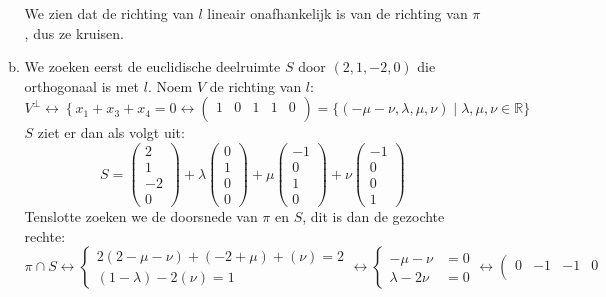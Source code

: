 \documentclass[main.tex]{subfiles}
\begin{document}
\begin{enumerate}
\begin{enumerate}[(a)]
\[    \]
    We zien dat de richting van $l$ lineair onafhankelijk is van de richting van $\pi$, dus ze kruisen.
  \item 
    We zoeken eerst de euclidische deelruimte $S$ door $(2,1,-2,0)$ die orthogonaal is met $l$.
    Noem $V$ de richting van $l$:
    \[
    V^{\bot} \leftrightarrow
    \left\{
    x_{1} + x_{3} + x_{4} = 0
    \right.
    \leftrightarrow
    \left(
      \begin{array}{cccc|c}
        1 & 0 & 1 & 1 & 0\\
      \end{array}
    \right)
    =
    \{ (-\mu -\nu, \lambda,\mu,\nu) \mid \lambda,\mu,\nu \in \mathbb{R} \}
    \]
    $S$ ziet er dan als volgt uit:
    \[ S  = 
    \begin{pmatrix}
      2\\1\\-2\\0
    \end{pmatrix}
    +
    \lambda
    \begin{pmatrix}
      0\\1\\0\\0
    \end{pmatrix}
    + \mu
    \begin{pmatrix}
      -1\\0\\1\\0
    \end{pmatrix}
    + \nu
    \begin{pmatrix}
      -1\\0\\0\\1
    \end{pmatrix}
    \]
    Tenslotte zoeken we de doorsnede van $\pi$ en $S$, dit is dan de gezochte rechte:
    \[
    \pi\cap S \leftrightarrow
    \left\{
      \begin{array}{c}
        2(2-\mu-\nu) + (-2+\mu) + (\nu) = 2\\
        (1-\lambda)-2(\nu) = 1
      \end{array}
    \right.
    \leftrightarrow
    \left\{
      \begin{array}{rl}
        -\mu -\nu&=0\\
        \lambda-2\nu&=0
      \end{array}
    \right.
    \leftrightarrow
    \left(
      \begin{array}{ccc|c}
        0 & -1 & -1 & 0\\

\end{array}\]
\end{enumerate}
\end{enumerate}
\end{document}
